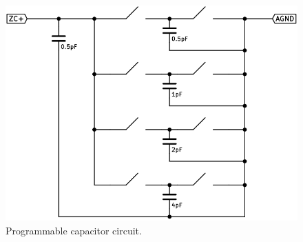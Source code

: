 \documentclass[12pt,oneside,final]{siuethesis}
\theoremstyle{definition}
\begin{document}
\begin{figure}[ht]
\centering
\includegraphics[scale=.6,keepaspectratio=true]{images/pcap_circuit.png} 
\caption{Programmable capacitor circuit.}
\label{fig:pcap}
\end{figure}
\end{document}
